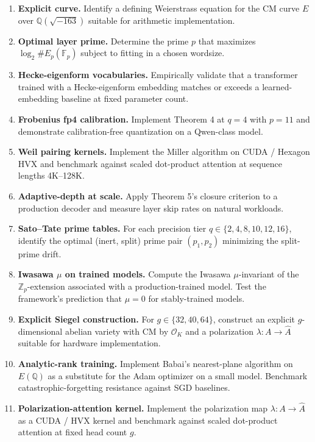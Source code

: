 \documentclass[
  11pt,
]{article}
\begin{document}
\begin{enumerate}
\def\labelenumi{\arabic{enumi}.}
\item
  \textbf{Explicit curve.} Identify a defining Weierstrass equation for
  the CM curve \(E\) over \(\mathbb{Q}(\sqrt{-163})\) suitable for
  arithmetic implementation.
\item
  \textbf{Optimal layer prime.} Determine the prime \(p\) that maximizes
  \(\log_2 \#E_p(\mathbb{F}_p)\) subject to fitting in a chosen
  wordsize.
\item
  \textbf{Hecke-eigenform vocabularies.} Empirically validate that a
  transformer trained with a Hecke-eigenform embedding matches or
  exceeds a learned-embedding baseline at fixed parameter count.
\item
  \textbf{Frobenius fp4 calibration.} Implement Theorem 4 at \(q = 4\)
  with \(p = 11\) and demonstrate calibration-free quantization on a
  Qwen-class model.
\item
  \textbf{Weil pairing kernels.} Implement the Miller algorithm on CUDA
  / Hexagon HVX and benchmark against scaled dot-product attention at
  sequence lengths 4K--128K.
\item
  \textbf{Adaptive-depth at scale.} Apply Theorem 5's closure criterion
  to a production decoder and measure layer skip rates on natural
  workloads.
\item
  \textbf{Sato--Tate prime tables.} For each precision tier
  \(q \in \{2, 4, 8, 10, 12, 16\}\), identify the optimal (inert, split)
  prime pair \((p_1, p_2)\) minimizing the split-prime drift.
\item
  \textbf{Iwasawa \(\mu\) on trained models.} Compute the Iwasawa
  \(\mu\)-invariant of the \(\mathbb{Z}_p\)-extension associated with a
  production-trained model. Test the framework's prediction that
  \(\mu = 0\) for stably-trained models.
\item
  \textbf{Explicit Siegel construction.} For \(g \in \{32, 40, 64\}\),
  construct an explicit \(g\)-dimensional abelian variety with CM by
  \(\mathcal{O}_K\) and a polarization \(\lambda : A \to \widehat{A}\)
  suitable for hardware implementation.
\item
  \textbf{Analytic-rank training.} Implement Babai's nearest-plane
  algorithm on \(E(\mathbb{Q})\) as a substitute for the Adam optimizer
  on a small model. Benchmark catastrophic-forgetting resistance against
  SGD baselines.
\item
  \textbf{Polarization-attention kernel.} Implement the polarization map
  \(\lambda : A \to \widehat{A}\) as a CUDA / HVX kernel and benchmark
  against scaled dot-product attention at fixed head count \(g\).
\end{enumerate}
\end{document}
